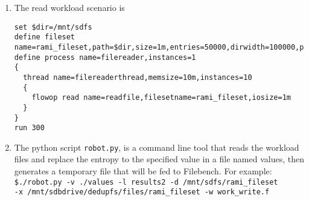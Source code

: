 \begin{enumerate}
\item The read workload scenario is\\
\begin{lstlisting}
set $dir=/mnt/sdfs
define fileset name=rami_fileset,path=$dir,size=1m,entries=50000,dirwidth=100000,prealloc,datasource=entro,entropy=3.0
define process name=filereader,instances=1
{
  thread name=filereaderthread,memsize=10m,instances=10
  {
    flowop read name=readfile,filesetname=rami_fileset,iosize=1m
  }
}
run 300
\end{lstlisting}
\item The python script \verb+robot.py+, is a command line tool that reads the workload files and replace the entropy to the specified value in a file named values, then generates a temporary file that will be fed to Filebench. For example: \\
\verb+$./robot.py -v ./values -l results2 -d /mnt/sdfs/rami_fileset+
\\
\verb&-x /mnt/sdbdrive/dedupfs/files/rami_fileset -w work_write.f&

\end{enumerate}
